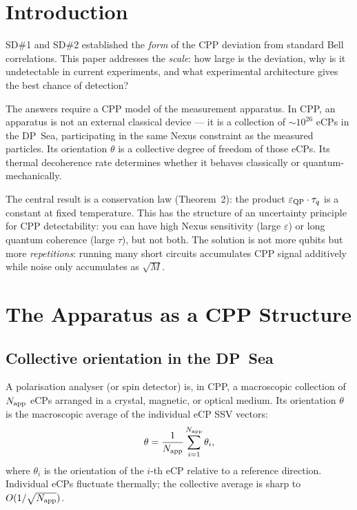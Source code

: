 \documentclass[11pt,a4paper]{article}
\newcommand{\eps}{\varepsilon}
\begin{document}
\tableofcontents
\newpage

\section{Introduction}

SD\#1 and SD\#2 established the \emph{form} of the CPP deviation
from standard Bell correlations.  This paper addresses the
\emph{scale}: how large is the deviation, why is it undetectable in
current experiments, and what experimental architecture gives the
best chance of detection?

The answers require a CPP model of the measurement apparatus.  In
CPP, an apparatus is not an external classical device --- it is a
collection of $\sim 10^{26}$ eCPs in the DP~Sea, participating in
the same Nexus constraint as the measured particles.  Its orientation
$\theta$ is a collective degree of freedom of those eCPs.  Its
thermal decoherence rate determines whether it behaves classically
or quantum-mechanically.

The central result is a conservation law (Theorem~2): the product
$\eps_{\rm QP} \cdot \tau_q$ is a constant at fixed temperature.
This has the structure of an uncertainty principle for CPP
detectability: you can have high Nexus sensitivity (large $\eps$)
or long quantum coherence (large $\tau$), but not both.  The
solution is not more qubits but more \emph{repetitions}: running
many short circuits accumulates CPP signal additively while noise
only accumulates as $\sqrt{M}$.

\section{The Apparatus as a CPP Structure}
\label{sec:apparatus_cpp}

\subsection{Collective orientation in the DP~Sea}

A polarisation analyser (or spin detector) is, in CPP, a
macroscopic collection of $N_{\rm app}$ eCPs arranged in a
crystal, magnetic, or optical medium.  Its orientation $\theta$
is the macroscopic average of the individual eCP SSV vectors:
\begin{equation}
\theta = \frac{1}{N_{\rm app}}\sum_{i=1}^{N_{\rm app}}\theta_i,
\label{eq:theta_collective}
\end{equation}
where $\theta_i$ is the orientation of the $i$-th eCP relative to
a reference direction.  Individual eCPs fluctuate thermally; the
collective average is sharp to $O(1/\sqrt{N_{\rm app}})$.
\end{document}
